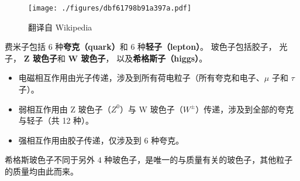 
\begin{issues}
\issueDraft
\end{issues}

\begin{figure}[ht]
\centering
\texttt{[image: ./figures/dbf61798b91a397a.pdf]}
\caption{翻译自 Wikipedia} \label{fig_BasPar_2}
\end{figure}

费米子包括 6 种\textbf{夸克（quark）}和 6 种\textbf{轻子（lepton）}。 玻色子包括胶子， 光子， \textbf{Z 玻色子}和 \textbf{W 玻色子}， 以及\textbf{希格斯子（higgs）}。

\begin{itemize}
\item 电磁相互作用由光子传递，涉及到所有荷电粒子（所有夸克和电子、$\mu$ 子和 $\tau$ 子）。
\item 弱相互作用由 Z 玻色子（$Z^0$）与 W 玻色子（$W^\pm$）传递，涉及到全部的夸克与轻子（共 12 种）。
\item 强相互作用由胶子传递，仅涉及到 $6$ 种夸克。
\end{itemize}

希格斯玻色子不同于另外 $4$ 种玻色子，是唯一的与质量有关的玻色子，其他粒子的质量均由此而来。


